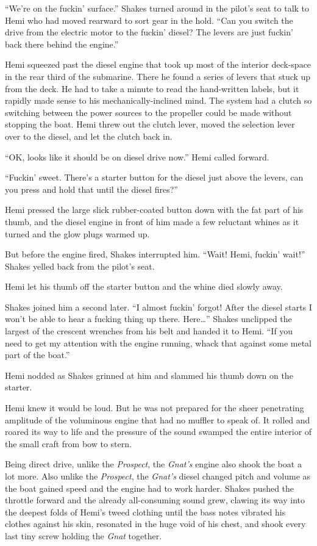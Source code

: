 \documentclass[]{scrbook}
\begin{document}
``We're on the fuckin' surface.'' Shakes turned around in the pilot's
seat to talk to Hemi who had moved rearward to sort gear in the hold.
``Can you switch the drive from the electric motor to the fuckin'
diesel? The levers are just fuckin' back there behind the engine.''

Hemi squeezed past the diesel engine that took up most of the interior
deck-space in the rear third of the submarine. There he found a series
of levers that stuck up from the deck. He had to take a minute to read
the hand-written labels, but it rapidly made sense to his
mechanically-inclined mind. The system had a clutch so switching between
the power sources to the propeller could be made without stopping the
boat. Hemi threw out the clutch lever, moved the selection lever over to
the diesel, and let the clutch back in.

``OK, looks like it should be on diesel drive now.'' Hemi called
forward.

``Fuckin' sweet. There's a starter button for the diesel just above the
levers, can you press and hold that until the diesel fires?''

Hemi pressed the large slick rubber-coated button down with the fat part
of his thumb, and the diesel engine in front of him made a few reluctant
whines as it turned and the glow plugs warmed up.

But before the engine fired, Shakes interrupted him. ``Wait! Hemi,
fuckin' wait!'' Shakes yelled back from the pilot's seat.

Hemi let his thumb off the starter button and the whine died slowly
away.

Shakes joined him a second later. ``I almost fuckin' forgot! After the
diesel starts I won't be able to hear a fucking thing up there.
Here\ldots{}'' Shakes unclipped the largest of the crescent wrenches
from his belt and handed it to Hemi. ``If you need to get my attention
with the engine running, whack that against some metal part of the
boat.''

Hemi nodded as Shakes grinned at him and slammed his thumb down on the
starter.

Hemi knew it would be loud. But he was not prepared for the sheer
penetrating amplitude of the voluminous engine that had no muffler to
speak of. It rolled and roared its way to life and the pressure of the
sound swamped the entire interior of the small craft from bow to stern.

Being direct drive, unlike the \emph{Prospect}, the \emph{Gnat's} engine
also shook the boat a lot more. Also unlike the \emph{Prospect}, the
\emph{Gnat's} diesel changed pitch and volume as the boat gained speed
and the engine had to work harder. Shakes pushed the throttle forward
and the already all-consuming sound grew, clawing its way into the
deepest folds of Hemi's tweed clothing until the bass notes vibrated his
clothes against his skin, resonated in the huge void of his chest, and
shook every last tiny screw holding the \emph{Gnat} together.
\end{document}
